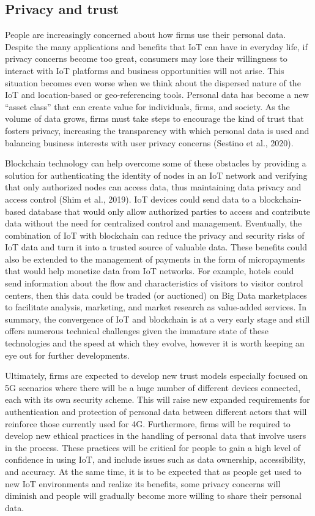 \documentclass[
  letterpaper,
  DIV=11,
  numbers=noendperiod]{scrreprt}
\begin{document}
\hypertarget{privacy-and-trust}{%
\subsection{Privacy and trust}\label{privacy-and-trust}}

People are increasingly concerned about how firms use their personal
data. Despite the many applications and benefits that IoT can have in
everyday life, if privacy concerns become too great, consumers may lose
their willingness to interact with IoT platforms and business
opportunities will not arise. This situation becomes even worse when we
think about the dispersed nature of the IoT and location-based or
geo-referencing tools. Personal data has become a new ``asset class''
that can create value for individuals, firms, and society. As the volume
of data grows, firms must take steps to encourage the kind of trust that
fosters privacy, increasing the transparency with which personal data is
used and balancing business interests with user privacy concerns
(Sestino et al., 2020).

Blockchain technology can help overcome some of these obstacles by
providing a solution for authenticating the identity of nodes in an IoT
network and verifying that only authorized nodes can access data, thus
maintaining data privacy and access control (Shim et al., 2019). IoT
devices could send data to a blockchain-based database that would only
allow authorized parties to access and contribute data without the need
for centralized control and management. Eventually, the combination of
IoT with blockchain can reduce the privacy and security risks of IoT
data and turn it into a trusted source of valuable data. These benefits
could also be extended to the management of payments in the form of
micropayments that would help monetize data from IoT networks. For
example, hotels could send information about the flow and
characteristics of visitors to visitor control centers, then this data
could be traded (or auctioned) on Big Data marketplaces to facilitate
analysis, marketing, and market research as value-added services. In
summary, the convergence of IoT and blockchain is at a very early stage
and still offers numerous technical challenges given the immature state
of these technologies and the speed at which they evolve, however it is
worth keeping an eye out for further developments.

Ultimately, firms are expected to develop new trust models especially
focused on 5G scenarios where there will be a huge number of different
devices connected, each with its own security scheme. This will raise
new expanded requirements for authentication and protection of personal
data between different actors that will reinforce those currently used
for 4G. Furthermore, firms will be required to develop new ethical
practices in the handling of personal data that involve users in the
process. These practices will be critical for people to gain a high
level of confidence in using IoT, and include issues such as data
ownership, accessibility, and accuracy. At the same time, it is to be
expected that as people get used to new IoT environments and realize its
benefits, some privacy concerns will diminish and people will gradually
become more willing to share their personal data.
\end{document}
